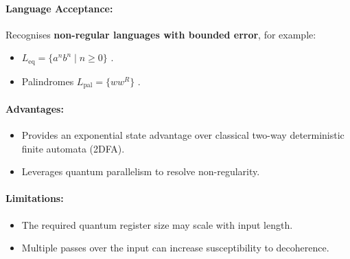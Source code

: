 \paragraph{Language Acceptance:}  
Recognises \textbf{non-regular languages with bounded error}, for example:
\begin{itemize}
    \item \( L_{\text{eq}} = \{a^n b^n \mid n \geq 0\} \) \cite{kondacs1997power}.
    \item Palindromes \( L_{\text{pal}} = \{ww^R\} \) \cite{yakaryilmaz2010succinctness}.
\end{itemize}

\paragraph{Advantages:}
\begin{itemize}
    \item Provides an exponential state advantage over classical two-way deterministic finite automata (2DFA).
    \item Leverages quantum parallelism to resolve non-regularity.
\end{itemize}

\paragraph{Limitations:}
\begin{itemize}
    \item The required quantum register size may scale with input length.
    \item Multiple passes over the input can increase susceptibility to decoherence.
\end{itemize}


